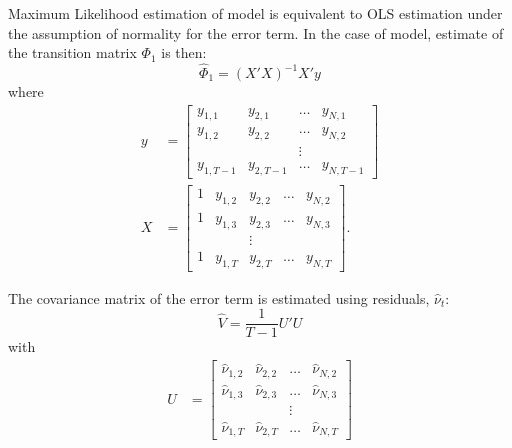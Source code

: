 Maximum Likelihood estimation of \varp{} model is equivalent to OLS estimation under the assumption of normality for the error term. In the case of \varp[1]{} model, estimate of the transition matrix $\Phi_1$ is then:
\[
    \hat\Phi_1 = (X'X)^{-1} X'y
\]
where
\begin{align*}
    y & = \begin{bmatrix}
              y_{1, 1}   & y_{2, 1}   & \ldots & y_{N, 1}   \\
              y_{1, 2}   & y_{2, 2}   & \ldots & y_{N, 2}   \\
                         &            & \vdots &            \\
              y_{1, T-1} & y_{2, T-1} & \ldots & y_{N, T-1}
          \end{bmatrix}
    \\[0.8cm]
    X & = \begin{bmatrix}
              1 & y_{1, 2} & y_{2, 2} & \ldots & y_{N, 2} \\
              1 & y_{1, 3} & y_{2, 3} & \ldots & y_{N, 3} \\
                &          & \vdots   &                   \\
              1 & y_{1, T} & y_{2, T} & \ldots & y_{N, T}
          \end{bmatrix}.
\end{align*}

The covariance matrix of the error term is estimated using residuals, $\hat \nu_t$:
\[
    \hat V = \frac{1}{T-1} U' U
\]
with
\begin{align*}
    U & = \begin{bmatrix}
              \hat\nu_{1, 2} & \hat\nu_{2, 2} & \ldots & \hat\nu_{N, 2} \\
              \hat\nu_{1, 3} & \hat\nu_{2, 3} & \ldots & \hat\nu_{N, 3} \\
                             &                & \vdots &                \\
              \hat\nu_{1, T} & \hat\nu_{2, T} & \ldots & \hat\nu_{N, T}
          \end{bmatrix}
\end{align*}

